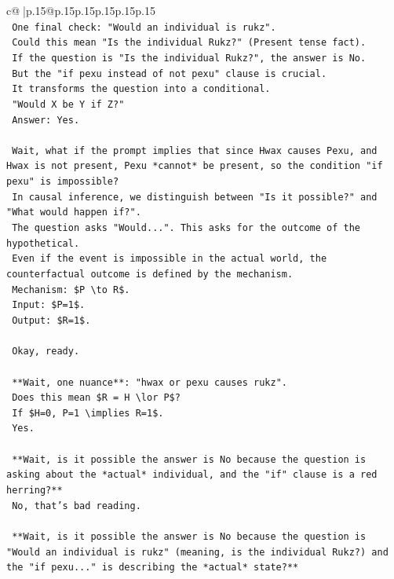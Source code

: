 \documentclass{article}
\begin{document}
{\begin{supertabular}{c@{$\;$}|p{.15\linewidth}@{}p{.15\linewidth}p{.15\linewidth}p{.15\linewidth}p{.15\linewidth}p{.15\linewidth}}
{{{\\ 
\texttt{    One final check: "Would an individual is rukz".} \\
\texttt{    Could this mean "Is the individual Rukz?" (Present tense fact).} \\
\texttt{    If the question is "Is the individual Rukz?", the answer is No.} \\
\texttt{    But the "if pexu instead of not pexu" clause is crucial.} \\
\texttt{    It transforms the question into a conditional.} \\
\texttt{    "Would X be Y if Z?"} \\
\texttt{    Answer: Yes.} \\
\\ 
\texttt{    Wait, what if the prompt implies that since Hwax causes Pexu, and Hwax is not present, Pexu *cannot* be present, so the condition "if pexu" is impossible?} \\
\texttt{    In causal inference, we distinguish between "Is it possible?" and "What would happen if?".} \\
\texttt{    The question asks "Would...". This asks for the outcome of the hypothetical.} \\
\texttt{    Even if the event is impossible in the actual world, the counterfactual outcome is defined by the mechanism.} \\
\texttt{    Mechanism: \$P \textbackslash{}to R\$.} \\
\texttt{    Input: \$P=1\$.} \\
\texttt{    Output: \$R=1\$.} \\
\\ 
\texttt{    Okay, ready.} \\
\\ 
\texttt{    **Wait, one nuance**: "hwax or pexu causes rukz".} \\
\texttt{    Does this mean \$R = H \textbackslash{}lor P\$?} \\
\texttt{    If \$H=0, P=1 \textbackslash{}implies R=1\$.} \\
\texttt{    Yes.} \\
\\ 
\texttt{    **Wait, is it possible the answer is No because the question is asking about the *actual* individual, and the "if" clause is a red herring?**} \\
\texttt{    No, that's bad reading.} \\
\\ 
\texttt{    **Wait, is it possible the answer is No because the question is "Would an individual is rukz" (meaning, is the individual Rukz?) and the "if pexu..." is describing the *actual* state?**} \\
}}}
\end{supertabular}}
\end{document}
